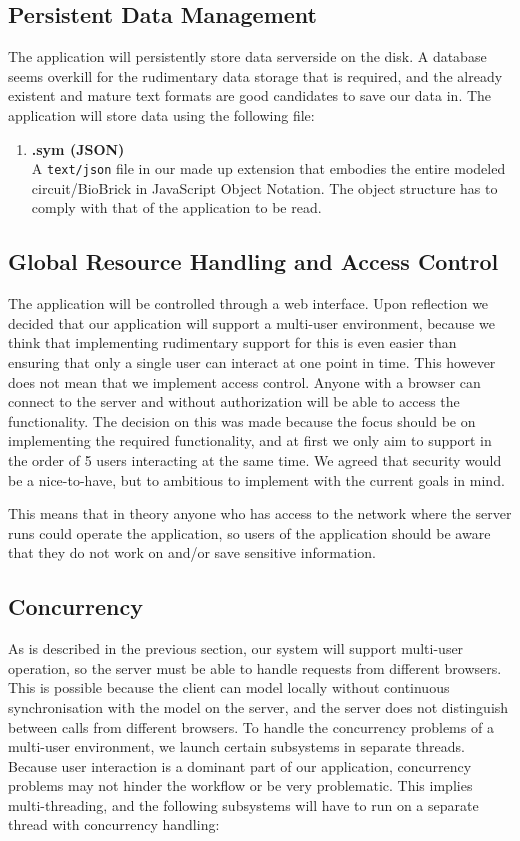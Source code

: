 \subsection{Persistent Data Management}
\label{ss-persitance}
The application will persistently store data serverside on the disk. A database seems overkill for the rudimentary data storage that is required, and the already existent and mature text formats are good candidates to save our data in. The application will store data using the following file:
\begin{enumerate}
\item \textbf{.sym (JSON)} \\
A \verb=text/json= file in our made up extension
that embodies the entire modeled circuit/BioBrick in JavaScript Object Notation. The object structure has to comply with that of the application to be read.\end{enumerate}

\subsection{Global Resource Handling and Access Control}
The application will be controlled through a web interface. Upon reflection we decided that our application will support a multi-user environment, because we think that implementing rudimentary support for this is even easier than ensuring that only a single user can interact at one point in time. This however does not mean that we implement access control. Anyone with a browser can connect to the server and without authorization will be able to access the functionality. The decision on this was made because the focus should be on implementing the required functionality, and at first we only aim to support in the order of 5 users interacting at the same time. We agreed that security  would be a nice-to-have, but to ambitious to implement with the current goals in mind.

This means that in theory anyone who has access to the network where the server runs could operate the application, so users of the application should be aware that they do not work on and/or save sensitive information.

\subsection{Concurrency}
As is described in the previous section, our system will support multi-user operation, so the server must be able to handle requests from different browsers. This is possible because the client can model locally without continuous synchronisation with the model on the server, and the server does not distinguish between calls from different browsers. To handle the concurrency problems of a multi-user environment, we launch certain subsystems in separate threads. Because user interaction is a dominant part of our application, concurrency problems may not hinder the workflow or be very problematic. This implies multi-threading, and the following subsystems will have to run on a separate thread with concurrency handling:

